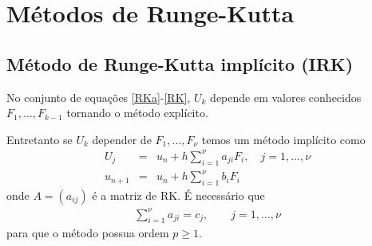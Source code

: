 %
%
%
%
%
%
%




\section{Métodos de Runge-Kutta}%


\subsection{Método de Runge-Kutta implícito (IRK)}
No conjunto de equações \eqref{RKa}-\eqref{RK}, $U_k$ depende em valores conhecidos $F_1,\ldots ,F_{k-1}$ tornando o método explícito.

Entretanto se $U_k$ depender de $F_1,\ldots ,F_\nu $ temos um método implícito como
\begin{eqnarray}\label{IRK}
  U_j &=&u_n  + h \sum_{i=1}^\nu  a_{ji} F_i, \quad  j=1,\ldots ,\nu \\
  u_{n+1}&=&u_n  + h \sum_{i=1}^{\nu } b_i F_i
\end{eqnarray}
onde $A=(a_{ij})$ é a matriz de RK. É necessário que
\begin{eqnarray}
 \sum_{i=1}^{\nu } a_{ji} = c_j, \quad \quad  j=1,\ldots ,\nu
\end{eqnarray}
para que o método possua ordem $p\geq 1$.


